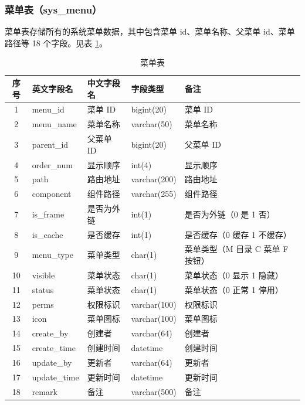 \documentclass{izdthesis}
\begin{document}
\subsubsection{菜单表（sys\_menu）}
菜单表存储所有的系统菜单数据，其中包含菜单 id、菜单名称、父菜单 id、菜单路径等 18 个字段。见表 \ref{tab4-4}。

\begin{table}[H]
  \centering
  \caption{菜单表}
  \label{tab4-4}
  \songti
  \begin{tabular}{c l l l p{4.5cm}}
    \toprule
    序号 & 英文字段名 & 中文字段名 & 字段类型 & 备注 \\
    \midrule
    1 & menu\_id & 菜单 ID & bigint(20) & 菜单 ID \\
    2 & menu\_name & 菜单名称 & varchar(50) & 菜单名称 \\
    3 & parent\_id & 父菜单 ID & bigint(20) & 父菜单 ID \\
    4 & order\_num & 显示顺序 & int(4) & 显示顺序 \\
    5 & path & 路由地址 & varchar(200) & 路由地址 \\
    6 & component & 组件路径 & varchar(255) & 组件路径 \\
    7 & is\_frame & 是否为外链 & int(1) & 是否为外链（0 是 1 否） \\
    8 & is\_cache & 是否缓存 & int(1) & 是否缓存（0 缓存 1 不缓存） \\
    9 & menu\_type & 菜单类型 & char(1) & 菜单类型（M 目录 C 菜单 F 按钮） \\
    10 & visible & 菜单状态 & char(1) & 菜单状态（0 显示 1 隐藏） \\
    11 & status & 菜单状态 & char(1) & 菜单状态（0 正常 1 停用） \\
    12 & perms & 权限标识 & varchar(100) & 权限标识 \\
    13 & icon & 菜单图标 & varchar(100) & 菜单图标 \\
    14 & create\_by & 创建者 & varchar(64) & 创建者 \\
    15 & create\_time & 创建时间 & datetime & 创建时间 \\
    16 & update\_by & 更新者 & varchar(64) & 更新者 \\
    17 & update\_time & 更新时间 & datetime & 更新时间 \\
    18 & remark & 备注 & varchar(500) & 备注 \\
    \bottomrule
  \end{tabular}
\end{table}
\end{document}
